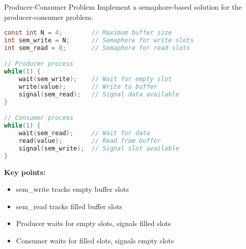 \begin{example2}{Producer-Consumer Problem}
    Implement a semaphore-based solution for the producer-consumer problem:
    
    \tcblower
    
\begin{lstlisting}[language=C, style=basesmol]
const int N = 4;        // Maximum buffer size
int sem_write = N;      // Semaphore for write slots
int sem_read = 0;       // Semaphore for read slots

// Producer process
while(1) {
    wait(sem_write);    // Wait for empty slot
    write(value);       // Write to buffer
    signal(sem_read);   // Signal data available
}

// Consumer process  
while(1) {
    wait(sem_read);     // Wait for data
    read(value);        // Read from buffer
    signal(sem_write);  // Signal slot available
}
\end{lstlisting}

    \textbf{Key points:}
    \begin{itemize}
        \item sem\_write tracks empty buffer slots
        \item sem\_read tracks filled buffer slots
        \item Producer waits for empty slots, signals filled slots
        \item Consumer waits for filled slots, signals empty slots
    \end{itemize}
\end{example2}

